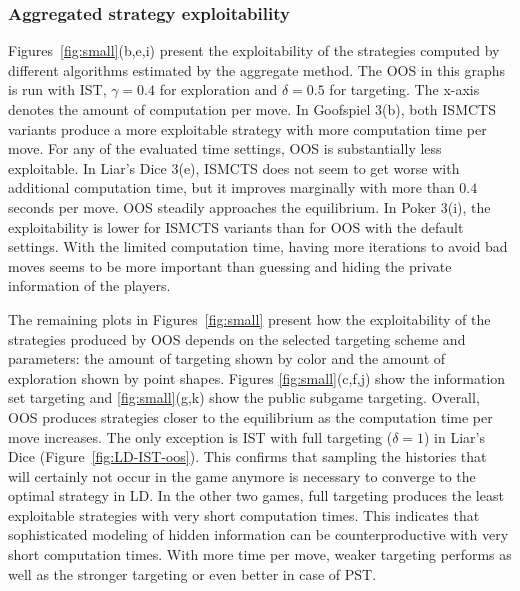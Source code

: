 \documentclass{aamas2015}
\newcounter{vlNoteCounter}
\newcommand{\vlnote}[1]{{\scriptsize \color{blue} $\blacksquare$ \refstepcounter{vlNoteCounter}\textsf{[VL]$_{\arabic{vlNoteCounter}}$:{#1}}}}
\renewcommand{\vlnote}[1]{}
\begin{document}
\subsubsection{Aggregated strategy exploitability}

Figures~\ref{fig:small}(b,e,i) present the exploitability of the strategies computed by different algorithms estimated by the aggregate method. %
The OOS in this graphs is run with IST, $\gamma=0.4$ for exploration and $\delta=0.5$ for targeting.
The x-axis denotes the amount of computation per move.
In Goofspiel 3(b), both ISMCTS variants produce a more exploitable strategy with more computation time per move.
For any of the evaluated time settings, OOS is substantially less exploitable.
In Liar's Dice 3(e), ISMCTS does not seem to get worse with additional computation time, but it improves marginally with more than $0.4$ seconds per move.
OOS steadily approaches the equilibrium.
In Poker 3(i), the exploitability is lower for ISMCTS variants than for OOS with the default settings.
With the limited computation time, having more iterations to avoid bad moves seems to be more important than guessing and hiding the private information of the players.

The remaining plots in Figures~\ref{fig:small} present how the exploitability of the strategies produced by OOS depends on the selected targeting scheme and parameters: the amount of targeting shown by color and the amount of exploration shown by point shapes. Figures \ref{fig:small}(c,f,j) show the information set targeting and \ref{fig:small}(g,k) show the public subgame targeting. Overall, OOS produces strategies closer to the equilibrium as the computation time per move increases. The only exception is IST with full targeting ($\delta=1$) in Liar's Dice (Figure~\ref{fig:LD-IST-oos}). This confirms that sampling the histories that will certainly not occur in the game anymore is necessary to converge to the optimal strategy in LD.
In the other two games, full targeting produces the least exploitable strategies with very short computation times. This indicates that sophisticated modeling of hidden information can be counterproductive with very short computation times. With more time per move, weaker targeting performs as well as the stronger targeting or even better in case of PST.

\vlnote{the next paragraph can be removed to save space}
\end{document}
